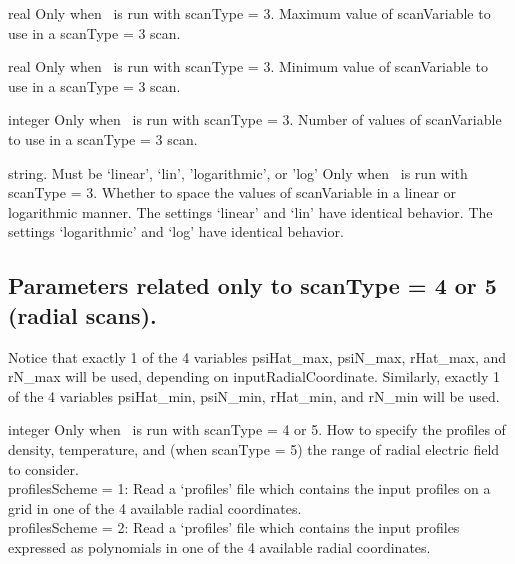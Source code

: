 \myhrule

{real}
{Only when \sfincsScan~is run with {\ttfamily scanType} = 3.}
{Maximum value of {\ttfamily scanVariable} to use in a {\ttfamily scanType} = 3 scan.}

\myhrule

{real}
{Only when \sfincsScan~is run with {\ttfamily scanType} = 3.}
{Minimum value of {\ttfamily scanVariable} to use in a {\ttfamily scanType} = 3 scan.}

\myhrule

{integer}
{Only when \sfincsScan~is run with {\ttfamily scanType} = 3.}
{Number of values of {\ttfamily scanVariable} to use in a {\ttfamily scanType} = 3 scan.}

\myhrule

{string. Must be `linear', `lin', 'logarithmic', or 'log'}
{Only when \sfincsScan~is run with {\ttfamily scanType} = 3.}
{Whether to space the values of {\ttfamily scanVariable} in a linear or logarithmic manner.
The settings `linear' and `lin' have identical behavior. 
The settings `logarithmic' and `log' have identical behavior.}

\myhrule


\subsection{Parameters related only to {\ttfamily scanType} = 4 or 5 (radial scans).}

Notice that exactly 1 of the 4 variables {\ttfamily psiHat\_max}, {\ttfamily psiN\_max}, {\ttfamily rHat\_max}, and {\ttfamily rN\_max}
will be used, depending on
{\ttfamily inputRadialCoordinate}.
Similarly, exactly 1 of the 4 variables
{\ttfamily psiHat\_min}, {\ttfamily psiN\_min}, {\ttfamily rHat\_min}, and {\ttfamily rN\_min}
will be used.

\myhrule

{integer}
{Only when \sfincsScan~is run with {\ttfamily scanType} = 4 or 5.}
{How to specify the profiles of density, temperature, and (when  {\ttfamily scanType} = 5)
the range of radial electric field to consider.\\

{\ttfamily profilesScheme} = 1: Read a `{\ttfamily profiles}' file which contains the input profiles on a grid in one of the 4 available radial coordinates.\\

{\ttfamily profilesScheme} = 2: Read a `{\ttfamily profiles}' file which contains the input profiles expressed as polynomials in one of the 4 available radial coordinates.
}

